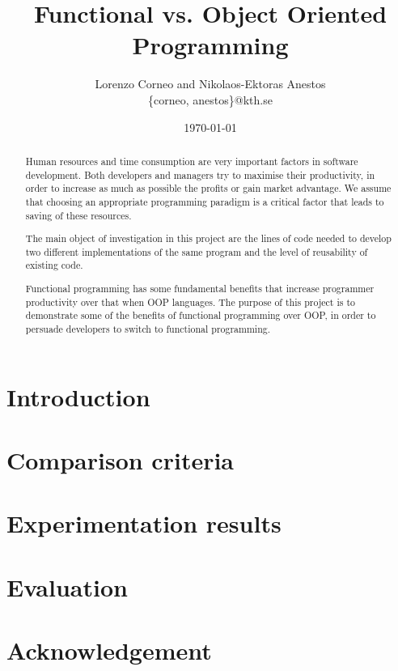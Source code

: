 \documentclass{article}
\begin{document}
\title{Functional vs. Object Oriented Programming}
\author{Lorenzo Corneo and Nikolaos-Ektoras Anestos \\
	\{corneo, anestos\}@kth.se}
\date{\today}
\maketitle

\begin{abstract}
Human resources and time consumption are very important factors in software development. Both developers and managers try to maximise their productivity, in order to increase as much as possible the profits or gain market advantage. We assume that choosing an appropriate programming paradigm is a critical factor that leads to saving of these resources.

The main object of investigation in this project are the lines of code needed to develop two different implementations of the same program and the level of reusability of existing code.

Functional programming has some fundamental benefits that increase programmer productivity over that when OOP languages. The purpose of this project is to demonstrate some of the benefits of functional programming over OOP, in order to persuade developers to switch to functional programming.
\end{abstract}

\section{Introduction}

\section{Comparison criteria}

\section{Experimentation results}

\section{Evaluation}

\section{Acknowledgement}
\end{document}

